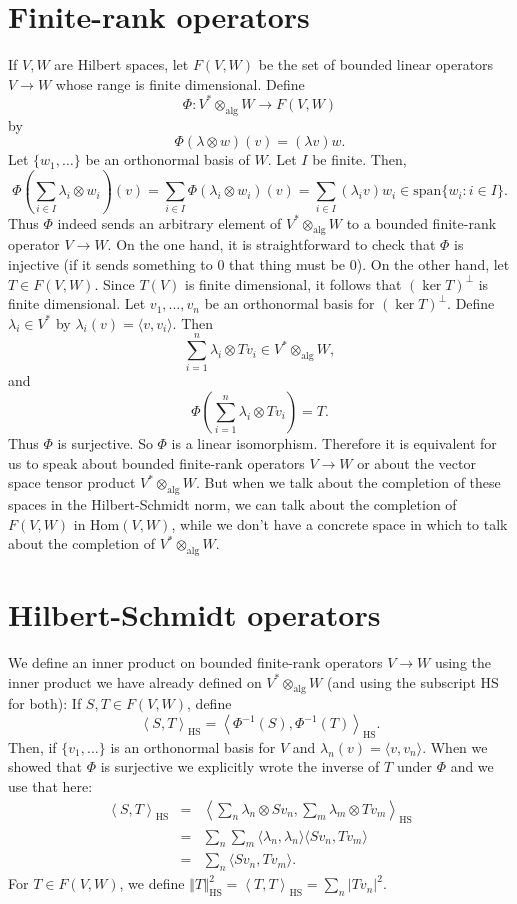 \documentclass{article}
\newcommand{\HSnorm}[1]{\left\Vert #1 \right\Vert_{\textrm{HS}}}
\newcommand{\HSinner}[2]{\left\langle #1, #2 \right\rangle_{\textrm{HS}}}
\newcommand{\inner}[2]{\langle #1, #2 \rangle}
\newcommand{\alg}{\otimes_{\textrm{alg}}}
\newcommand{\Span}{\textrm{span}}
\newcommand{\Hom}{\textrm{Hom}}
\begin{document}
\section{Finite-rank operators}
If $V,W$ are Hilbert spaces,
let $F(V,W)$ be the set of bounded linear operators $V \to W$ whose range is finite dimensional.
Define
\[
\Phi:V^* \alg W \to F(V,W)
\] 
by
\[
\Phi(\lambda \otimes w)(v)=(\lambda v)w.
\] 
Let $\{w_1,\ldots\}$ be an orthonormal basis of $W$. Let $I$ be finite. Then,
\[
\Phi\left( \sum_{i \in I} \lambda_i \otimes w_i \right)(v)=\sum_{i \in I} \Phi(\lambda_i \otimes w_i)(v)
=\sum_{i \in I} (\lambda_i v)w_i \in \Span\{w_i: i \in I\}.
\]
Thus $\Phi$ indeed sends an arbitrary element of $V^* \alg W$ to a bounded finite-rank operator $V \to W$. 
On the one hand, it is straightforward to check that $\Phi$ is injective (if it sends something to $0$ that thing must be $0$).
On the other hand, let $T\in F(V,W)$. Since $T(V)$ is finite dimensional, it follows that $(\ker T)^\perp$ 
is finite dimensional. Let $v_1,\ldots,v_n$ be an orthonormal basis for $(\ker T)^\perp$. Define
$\lambda_i \in V^*$ by $\lambda_i(v)=\inner{v}{v_i}$. Then
\[
\sum_{i=1}^n \lambda_i \otimes Tv_i \in V^* \alg W,
\]
and
\[
\Phi\left(\sum_{i=1}^n \lambda_i \otimes Tv_i \right)=T.
\]
Thus $\Phi$ is surjective. So $\Phi$ is a linear isomorphism.
Therefore it is equivalent for us to speak about bounded finite-rank operators $V \to W$ or about the vector space tensor product $V^* \alg W$.
But when we talk about the completion of these spaces in the Hilbert-Schmidt norm, we can talk about the completion of $F(V,W)$ in $\Hom(V,W)$, while we don't have a concrete space in which
to talk about the completion of $V^* \alg W$.

\section{Hilbert-Schmidt operators}
We define an inner product on bounded finite-rank operators $V \to W$
using the inner product we have already defined on $V^* \alg W$ (and using the subscript HS for both):
If $S,T \in F(V,W)$, define
\[
\HSinner{S}{T}=\HSinner{\Phi^{-1}(S)}{\Phi^{-1}(T)}.
\]
Then, if $\{v_1,\ldots\}$ is an orthonormal basis for $V$ and $\lambda_n(v)=\inner{v}{v_n}$. When we showed that $\Phi$ is surjective we explicitly wrote the inverse of $T$ under $\Phi$ and we use that here:
\begin{eqnarray*}
\HSinner{S}{T} &=& \HSinner{ \sum_n \lambda_n \otimes S v_n}{\sum_m \lambda_m \otimes T v_m}\\
&=&\sum_n \sum_m \inner{\lambda_n}{\lambda_n} \inner{Sv_n}{Tv_m}\\
&=&\sum_n \inner{Sv_n}{Tv_m}.
\end{eqnarray*}
For $T \in F(V,W)$, we define $\HSnorm{T}^2=\HSinner{T}{T}=\sum_n |Tv_n|^2$.
\end{document}
